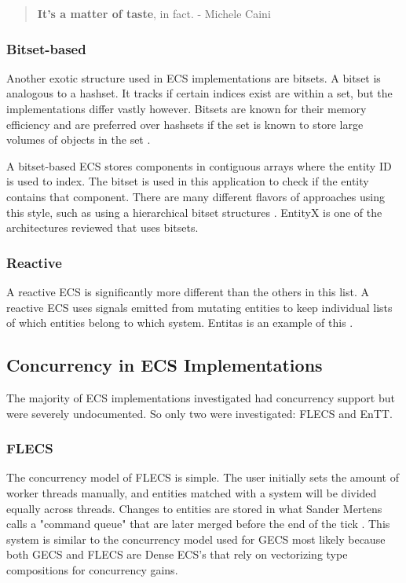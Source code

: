 \begin{quote}
    \textbf{It’s a matter of taste}, in fact.
        - Michele Caini
\end{quote}

\subsubsection{Bitset-based}
Another exotic structure used in ECS implementations are bitsets. A bitset is analogous to a hashset. It tracks if certain indices exist are within a set, but the implementations differ vastly however. Bitsets are known for their memory efficiency and are preferred over hashsets if the set is known to store large volumes of objects in the set \cite{Sutherland2014}.

A bitset-based ECS stores components in contiguous arrays where the entity ID is used to index. The bitset is used in this application to check if the entity contains that component. There are many different flavors of approaches using this style, such as using a hierarchical bitset structures \cite{SanderMertensFAQ}. EntityX is one of the architectures reviewed that uses bitsets.

\subsubsection{Reactive}
A reactive ECS is significantly more different than the others in this list. A reactive ECS uses signals emitted from mutating entities to keep individual lists of which entities belong to which system. Entitas is an example of this \cite{SanderMertensECS}.

\subsection{Concurrency in ECS Implementations}
The majority of ECS implementations investigated had concurrency support but were severely undocumented. So only two were investigated: FLECS and EnTT.

\subsubsection{FLECS}
The concurrency model of FLECS is simple. The user initially sets the amount of worker threads manually, and entities matched with a system will be divided equally across threads. Changes to entities are stored in what Sander Mertens calls a "command queue" that are later merged before the end of the tick \cite{missing_docs}. This system is similar to the concurrency model used for GECS most likely because both GECS and FLECS are Dense ECS's that rely on vectorizing type compositions for concurrency gains.

